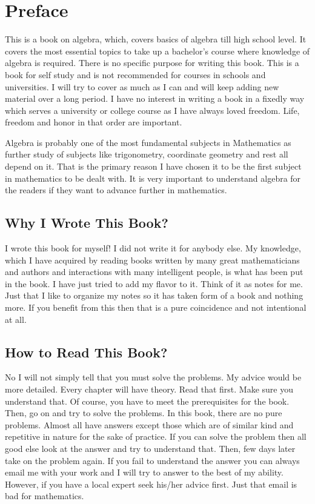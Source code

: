 \chapter{Preface}
This is a book on algebra, which, covers basics of algebra till high school level. It covers the most essential topics to take up a
bachelor's course where knowledge of algebra is required. There is no specific purpose for writing this book. This is a book for
self study and is not recommended for courses in schools and universities. I will try to cover as much as I can and will keep
adding new material over a long period. I have no interest in writing a book in a fixedly way which serves a university or college
course as I have always loved freedom. Life, freedom and honor in that order are important.

Algebra is probably one of the most fundamental subjects in Mathematics as further study of subjects like trigonometry, coordinate
geometry and rest all depend on it. That is the primary reason I have chosen it to be the first subject in mathematics to be dealt
with. It is very important to understand algebra for the readers if they want to advance further in mathematics.

\section*{Why I Wrote This Book?}
I wrote this book for myself! I did not write it for anybody else. My knowledge, which I have acquired by reading books written by
many great mathematicians and authors and interactions with many intelligent people, is what has been put in the book. I have just
tried to add my flavor to it. Think of it as notes for me. Just that I like to organize my notes so it has taken form of a book and
nothing more. If you benefit from this then that is a pure coincidence and not intentional at all.

\section*{How to Read This Book?}
No I will not simply tell that you must solve the problems. My advice would be more detailed. Every chapter will have theory. Read
that first. Make sure you understand that. Of course, you have to meet the prerequisites for the book. Then, go on and try to solve
the problems. In this book, there are no pure problems. Almost all have answers except those which are of similar kind and
repetitive in nature for the sake of practice. If you can solve the problem then all good else look at the answer and try to
understand that. Then, few days later take on the problem again. If you fail to understand the answer you can always email me with
your work and I will try to answer to the best of my ability. However, if you have a local expert seek his/her advice first. Just
that email is bad for mathematics.

